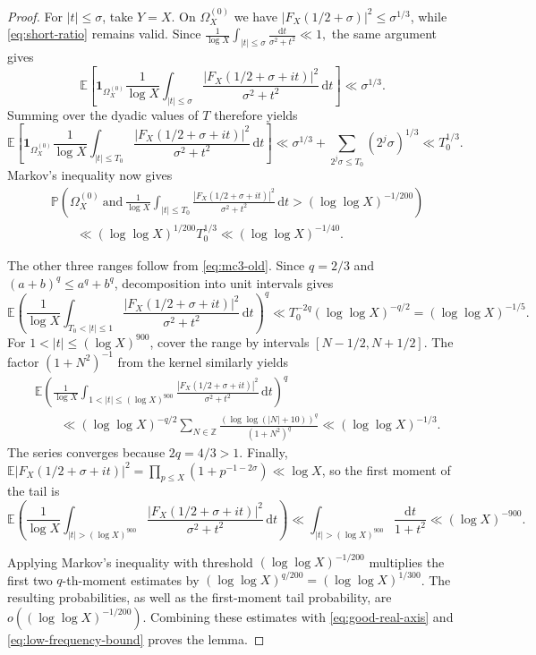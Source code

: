 \documentclass[a4paper,12pt,reqno]{amsart}
\numberwithin{equation}{section}
\theoremstyle{remark}
\newcommand{\E}{\mathbb{E}}
\newcommand{\p}{\mathbb{P}}
\newcommand{\Z}{\mathbb{Z}}
\begin{document}
\begin{proof}
For $|t|\leq\sigma$, take $Y=X$. On
$\Omega_X^{(0)}$ we have
$|F_X(1/2+\sigma)|^2\leq\sigma^{1/3}$, while
\eqref{eq:short-ratio} remains valid. Since
\(
 \frac1{\log X}
 \int_{|t|\leq\sigma}\frac{\mathrm{d}t}{\sigma^2+t^2}
 \ll1,
\)
the same argument gives
\[
 \E\left[
 \mathbf 1_{\Omega_X^{(0)}}
 \frac1{\log X}
 \int_{|t|\leq\sigma}
 \frac{|F_X(1/2+\sigma+it)|^2}{\sigma^2+t^2}\,\mathrm{d}t
 \right]
 \ll\sigma^{1/3}.
\]
Summing over the dyadic values of $T$ therefore yields
\[
 \E\left[
 \mathbf 1_{\Omega_X^{(0)}}
 \frac1{\log X}
 \int_{|t|\leq T_0}
 \frac{|F_X(1/2+\sigma+it)|^2}{\sigma^2+t^2}\,\mathrm{d}t
 \right]
 \ll
 \sigma^{1/3}+\sum_{2^j\sigma\leq T_0}(2^j\sigma)^{1/3}
 \ll T_0^{1/3}.
\]
Markov's inequality now gives
\begin{equation}\label{eq:low-frequency-bound}
 \begin{aligned}
 &\p\left(
 \Omega_X^{(0)}\ \text{and}\
 \frac1{\log X}\int_{|t|\leq T_0}
 \frac{|F_X(1/2+\sigma+it)|^2}{\sigma^2+t^2}\,\mathrm{d}t
 >(\log\log X)^{-1/200}
 \right)\\
 &\qquad\ll
 (\log\log X)^{1/200}T_0^{1/3}
 \ll (\log\log X)^{-1/40}.
 \end{aligned}
\end{equation}

The other three ranges follow from \eqref{eq:mc3-old}.  Since $q=2/3$ and
$(a+b)^q\leq a^q+b^q$, decomposition into unit intervals gives
\begin{equation}\label{eq:middle-frequency-bound}
 \E\left(
 \frac1{\log X}\int_{T_0<|t|\leq1}
 \frac{|F_X(1/2+\sigma+it)|^2}{\sigma^2+t^2}\,\mathrm{d}t
 \right)^q
 \ll T_0^{-2q}(\log\log X)^{-q/2}=(\log\log X)^{-1/5}.
\end{equation}
For $1<|t|\leq(\log X)^{900}$, cover the range by intervals
$[N-1/2,N+1/2]$. The factor $(1+N^2)^{-1}$ from the kernel
similarly yields
\[
 \begin{aligned}
 &\E\left(
 \frac1{\log X}\int_{1<|t|\leq(\log X)^{900}}
 \frac{|F_X(1/2+\sigma+it)|^2}{\sigma^2+t^2}\,\mathrm{d}t
 \right)^q\\
 &\qquad\ll (\log\log X)^{-q/2}\sum_{N\in\Z}
 \frac{(\log\log(|N|+10))^q}{(1+N^2)^q}
 \ll (\log\log X)^{-1/3}.
 \end{aligned}
\]
The series converges because $2q=4/3>1$. Finally,
$\E|F_X(1/2+\sigma+it)|^2
=\prod_{p\leq X}(1+p^{-1-2\sigma})\ll\log X$, so the first moment of the
tail is
\[
 \E\left(
 \frac1{\log X}\int_{|t|>(\log X)^{900}}
 \frac{|F_X(1/2+\sigma+it)|^2}{\sigma^2+t^2}\,\mathrm{d}t
 \right)\ll
 \int_{|t|>(\log X)^{900}}\frac{\mathrm{d}t}{1+t^2}
 \ll(\log X)^{-900}.
\]

Applying Markov's inequality with threshold $(\log\log X)^{-1/200}$ multiplies the first two
$q$-th-moment estimates by $(\log\log X)^{q/200}=(\log\log X)^{1/300}$.  The resulting
probabilities, as well as the first-moment tail probability, are
$o((\log\log X)^{-1/200})$.  Combining these estimates with
\eqref{eq:good-real-axis} and \eqref{eq:low-frequency-bound} proves the
lemma.
\end{proof}
\end{document}
